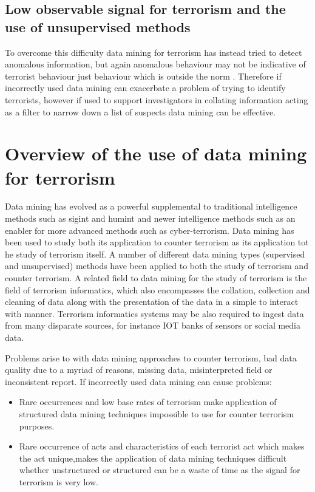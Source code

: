\subsection{Low observable signal for terrorism and the use of unsupervised methods}
To overcome this difficulty data mining for terrorism has instead tried to detect anomalous information, but again anomalous behaviour may not be indicative of terrorist behaviour just behaviour which is outside the norm \citep{thuraisingham2004data}. Therefore if incorrectly used data mining can exacerbate a problem of trying to identify terrorists, however if used to support investigators in collating information acting as a filter to narrow down a list of suspects data mining can be effective.

\section{Overview of the use of data mining for terrorism}
Data mining has evolved as a powerful supplemental to traditional intelligence methods such as sigint and humint and newer intelligence methods such as an enabler for more advanced methods such as cyber-terrorism. Data mining has been used to study both its application to counter terrorism as its application tot he study of terrorism itself. A number of different data mining  types (supervised and unsupervised) methods  have been applied to both the study of terrorism and counter terrorism. A related field to data mining for the study of terrorism is the field of terrorism informatics, which also encompasses the collation, collection and cleaning of data along with the presentation of the data in a simple to interact with manner. Terrorism informatics systems may be also required to ingest data from many disparate sources, for instance IOT banks of sensors or social media data.

Problems arise to with data mining approaches to counter terrorism, bad data quality due to a myriad of reasons, missing data, misinterpreted field or inconsistent report.
If incorrectly used data mining can cause problems:
\begin{itemize}
\item Rare occurrences and low base rates of terrorism make application of structured data mining techniques impossible to use for counter terrorism purposes.
\item Rare occurrence of acts and characteristics of each terrorist act which  makes the act unique,makes the application of  data mining techniques difficult whether unstructured or structured can be a waste of time as the signal for terrorism is very low.
\end{itemize}

